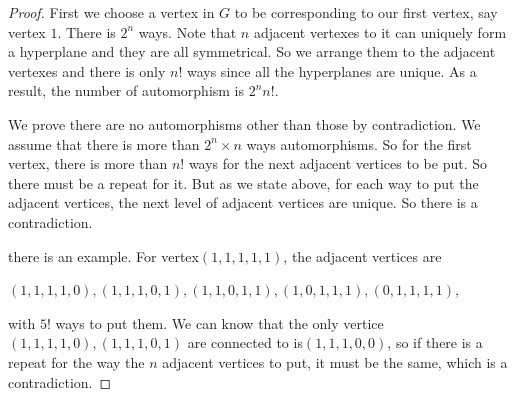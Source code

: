 




\begin{proof}

First we choose a vertex in $G$ to be corresponding to our first vertex, say vertex $1$. There is $2^n$ ways. Note that $n$ adjacent vertexes to it can uniquely form a hyperplane and they are all symmetrical. So we arrange them to the adjacent vertexes and there is only $n!$ ways since all the hyperplanes are unique.
As a result, the number of automorphism is $2^nn!$.

 \par We prove there are no automorphisms other than those by contradiction. We assume that there is more than $2^n\times n$ ways automorphisms. So for the first vertex, there is more than $n!$ ways for the next adjacent vertices to be put. So there must be a repeat for it. But as we state above, for each way to put the adjacent vertices, the next level of adjacent vertices are unique. So there is a contradiction. 
 \par there is an example. For vertex$(1,1,1,1,1)$, the adjacent vertices are
 \begin{center}
 $(1,1,1,1,0),(1,1,1,0,1),(1,1,0,1,1),(1,0,1,1,1),(0,1,1,1,1)$,
  \end{center}
  with $5!$ ways to put them. We can know that the only vertice $(1,1,1,1,0),(1,1,1,0,1)$ are connected to is$(1,1,1,0,0)$, so if there is a repeat for the way the $n$ adjacent vertices to put, it must be the same, which is a contradiction.
\end{proof}
